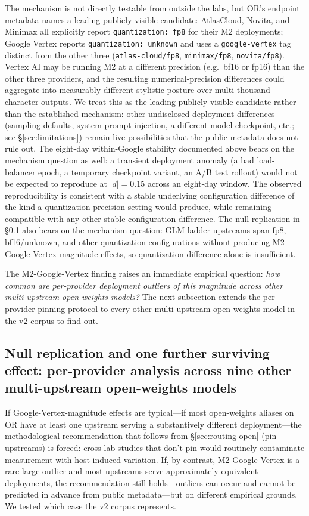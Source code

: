 \documentclass[11pt,a4paper]{article}
\begin{document}
The mechanism is not directly testable from outside the labs, but OR's endpoint metadata names a leading publicly visible candidate: AtlasCloud, Novita, and Minimax all explicitly report \texttt{quantization: fp8} for their M2 deployments; Google Vertex reports \texttt{quantization: unknown} and uses a \texttt{google-vertex} tag distinct from the other three (\texttt{atlas-cloud/fp8}, \texttt{minimax/fp8}, \texttt{novita/fp8}). Vertex AI may be running M2 at a different precision (e.g.\ bf16 or fp16) than the other three providers, and the resulting numerical-precision differences could aggregate into measurably different stylistic posture over multi-thousand-character outputs. We treat this as the leading publicly visible candidate rather than the established mechanism: other undisclosed deployment differences (sampling defaults, system-prompt injection, a different model checkpoint, etc.; see \S\ref{sec:limitations}) remain live possibilities that the public metadata does not rule out. The eight-day within-Google stability documented above bears on the mechanism question as well: a transient deployment anomaly (a bad load-balancer epoch, a temporary checkpoint variant, an A/B test rollout) would not be expected to reproduce at $|d|{=}0.15$ across an eight-day window. The observed reproducibility is consistent with a stable underlying configuration difference of the kind a quantization-precision setting would produce, while remaining compatible with any other stable configuration difference. The null replication in \S\ref{sec:routing-null-replication} also bears on the mechanism question: GLM-ladder upstreams span fp8, bf16/unknown, and other quantization configurations without producing M2-Google-Vertex-magnitude effects, so quantization-difference alone is insufficient.

The M2-Google-Vertex finding raises an immediate empirical question: \emph{how common are per-provider deployment outliers of this magnitude across other multi-upstream open-weights models?} The next subsection extends the per-provider pinning protocol to every other multi-upstream open-weights model in the v2 corpus to find out.

\subsection{Null replication and one further surviving effect: per-provider analysis across nine other multi-upstream open-weights models}
\label{sec:routing-null-replication}

If Google-Vertex-magnitude effects are typical---if most open-weights aliases on OR have at least one upstream serving a substantively different deployment---the methodological recommendation that follows from \S\ref{sec:routing-open} (pin upstreams) is forced: cross-lab studies that don't pin would routinely contaminate measurement with host-induced variation. If, by contrast, M2-Google-Vertex is a rare large outlier and most upstreams serve approximately equivalent deployments, the recommendation still holds---outliers can occur and cannot be predicted in advance from public metadata---but on different empirical grounds. We tested which case the v2 corpus represents.
\end{document}
